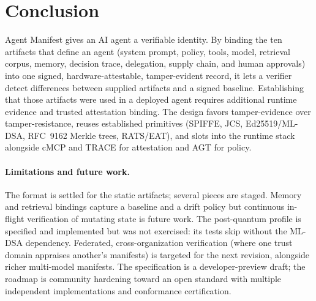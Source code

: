 \section{Conclusion}
\label{sec:conclusion}

Agent Manifest gives an AI agent a verifiable identity. By binding the ten artifacts
that define an agent (system prompt, policy, tools, model, retrieval corpus,
memory, decision trace, delegation, supply chain, and human approvals) into one
signed, hardware-attestable, tamper-evident record, it lets a verifier detect differences between supplied artifacts and a signed
baseline. Establishing that those artifacts were used in a deployed agent requires
additional runtime evidence and trusted attestation binding. The design favors
tamper-evidence over tamper-resistance, reuses established primitives (SPIFFE, JCS,
Ed25519/ML-DSA, RFC~9162 Merkle trees, RATS/EAT), and slots into the runtime stack
alongside cMCP and TRACE for attestation and AGT for policy.

\paragraph{Limitations and future work.}
The format is settled for the static artifacts; several pieces are staged. Memory and
retrieval bindings capture a baseline and a drift policy but continuous in-flight
verification of mutating state is future work. The post-quantum profile is specified
and implemented but was not exercised: its tests skip without the ML-DSA
dependency. Federated, cross-organization
verification (where one trust domain appraises another's manifests) is targeted
for the next revision, alongside richer multi-model manifests. The specification is a
developer-preview draft; the roadmap is community hardening toward an open standard
with multiple independent implementations and conformance certification.
